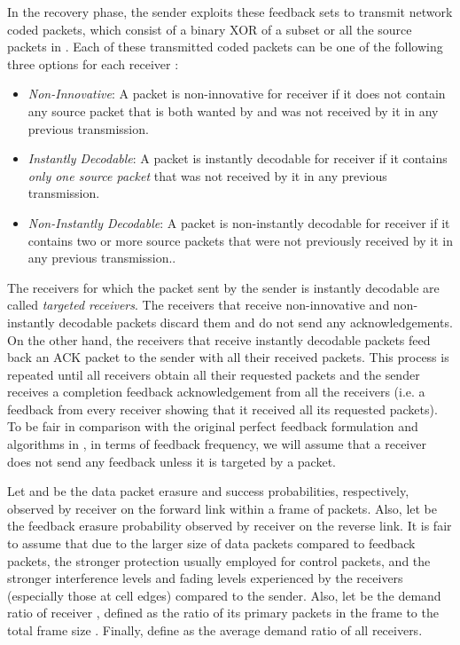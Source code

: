 \documentclass[10pt,jounral]{IEEEtran}
\begin{document}
In the recovery phase, the sender exploits these feedback sets to transmit network coded packets, which consist of a binary XOR of a subset or all the source packets in . Each of these transmitted coded packets can be one of the following three options for each receiver :
\begin{itemize}
\item \emph{Non-Innovative}: A packet is non-innovative for receiver  if it does not contain any source packet that is both wanted by  and was not received by it in any previous transmission.
\item \emph{Instantly Decodable}: A packet is instantly decodable for receiver  if it contains \emph{only one source packet} that was not received by it in any previous transmission.
\item \emph{Non-Instantly Decodable}: A packet is non-instantly decodable for receiver  if it contains {two or more source packets} that were not previously received by it in any previous transmission..
\end{itemize}
The receivers for which the packet sent by the sender is instantly decodable are called \emph{targeted receivers}. The receivers that receive non-innovative and non-instantly decodable packets discard them and do not send any acknowledgements. On the other hand, the receivers that receive instantly decodable packets feed back an ACK packet to the sender with all their received packets. This process is repeated until all receivers obtain all their requested packets and the sender receives a completion feedback acknowledgement from all the receivers (i.e. a feedback from every receiver showing that it received all its requested packets). To be fair in comparison with the original perfect feedback formulation and algorithms in \cite{ICC10,TON10-CD}, in terms of feedback frequency, we will assume that a receiver does not send any feedback unless it is targeted by a packet.

Let  and  be the data packet erasure and success probabilities, respectively, observed by receiver  on the forward link within a frame of packets. Also, let  be the feedback erasure probability observed by receiver  on the reverse link. It is fair to assume that  due to the larger size of data packets compared to feedback packets, the stronger protection usually employed for control packets, and the stronger interference levels and fading levels experienced by the receivers (especially those at cell edges) compared to the sender. Also, let  be the demand ratio of receiver , defined as the ratio of its primary packets in the frame to the total frame size . Finally, define  as the average demand ratio of all receivers.
\end{document}
